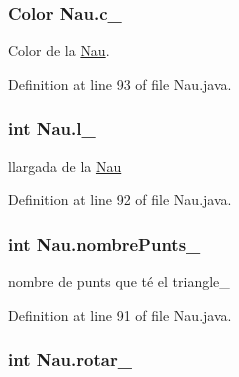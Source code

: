 \hypertarget{class_nau_a5447088ba94469c8f4285650b25211fa}{}
\subsubsection[{c\+\_\+}]{\setlength{\rightskip}{0pt plus 5cm}Color Nau.\+c\+\_\+\hspace{0.3cm}{\ttfamily [private]}}\label{class_nau_a5447088ba94469c8f4285650b25211fa}


Color de la \hyperlink{class_nau}{Nau}. 



Definition at line 93 of file Nau.\+java.

\hypertarget{class_nau_a67c5417119c7e520e1876a919119867d}{}
\subsubsection[{l\+\_\+}]{\setlength{\rightskip}{0pt plus 5cm}int Nau.\+l\+\_\+\hspace{0.3cm}{\ttfamily [protected]}}\label{class_nau_a67c5417119c7e520e1876a919119867d}


llargada de la \hyperlink{class_nau}{Nau} 



Definition at line 92 of file Nau.\+java.

\hypertarget{class_nau_adaf4948df660e9cfcac14a3fb75de454}{}
\subsubsection[{nombre\+Punts\+\_\+}]{\setlength{\rightskip}{0pt plus 5cm}int Nau.\+nombre\+Punts\+\_\+\hspace{0.3cm}{\ttfamily [private]}}\label{class_nau_adaf4948df660e9cfcac14a3fb75de454}


nombre de punts que té el triangle\+\_\+ 



Definition at line 91 of file Nau.\+java.

\hypertarget{class_nau_a128a1860c49ef16bfd63406f4ef0db75}{}
\subsubsection[{rotar\+\_\+}]{\setlength{\rightskip}{0pt plus 5cm}int Nau.\+rotar\+\_\+\hspace{0.3cm}{\ttfamily [private]}}\label{class_nau_a128a1860c49ef16bfd63406f4ef0db75}


